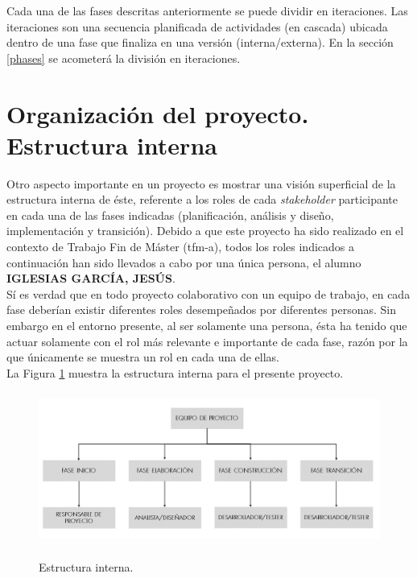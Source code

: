 \documentclass[12pt,a4paper, twoside]{report}
\newcommand{\jesus}{IGLESIAS GARCÍA, JESÚS}
\begin{document}
	Cada una de las fases descritas anteriormente se puede dividir en iteraciones. Las iteraciones son una secuencia planificada de actividades (en cascada) ubicada dentro de una fase que finaliza en una versión (interna/externa). En la sección \ref{phases} se acometerá la división en iteraciones.			
			
	\section{Organización del proyecto. Estructura interna}

	Otro aspecto importante en un proyecto es mostrar una visión superficial de la estructura interna de éste, referente a los roles de cada \textit{\gls{stakeholder}} participante en cada una de las fases indicadas (planificación, análisis y diseño, implementación y transición). Debido a que este proyecto ha sido realizado en el contexto de Trabajo Fin de Máster (\gls{tfm-a}), todos los roles indicados a continuación han sido llevados a cabo por una única persona, el alumno \textbf{\jesus}. \\
	
	Sí es verdad que en todo proyecto colaborativo con un equipo de trabajo, en cada fase deberían existir diferentes roles desempeñados por diferentes personas. Sin embargo en el entorno presente, al ser solamente una persona, ésta ha tenido que actuar solamente con el rol más relevante e importante de cada fase, razón por la que únicamente se muestra un rol en cada una de ellas. \\
	
	La Figura \ref{fig:plannig-organization} muestra la estructura interna para el presente proyecto.

	\begin{figure}[!ht]   
		\caption{Estructura interna.} 
		\begin{center} 
	 		\includegraphics[width=13cm,height=5cm]{Images/planning/intern_organization} \\
			\label{fig:plannig-organization} 
		\end{center}  
	\end{figure}  
\end{document}
